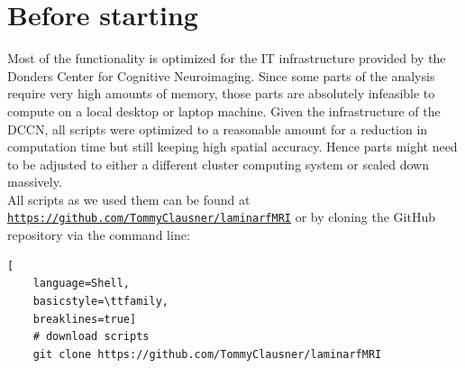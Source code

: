 \documentclass[12pt,a4paper]{scrartcl}
\begin{document}
\section{Before starting}
Most of the functionality is optimized for the IT infrastructure provided by the Donders Center for Cognitive Neuroimaging. Since some parts of the analysis require very high amounts of memory, those parts are absolutely infeasible to compute on a local desktop or laptop machine. Given the infrastructure of the DCCN, all scripts were optimized to a reasonable amount for a reduction in computation time but still keeping high spatial accuracy. Hence parts might need to be adjusted to either a different cluster computing system or scaled down massively.\\
All scripts as we used them can be found at \href{https://github.com/TommyClausner/laminarfMRI}{\nolinkurl{https://github.com/TommyClausner/laminarfMRI}}
or by cloning the GitHub repository via the command line:
\begin{lstlisting}[
    language=Shell,
    basicstyle=\ttfamily,
    breaklines=true]
    # download scripts
    git clone https://github.com/TommyClausner/laminarfMRI
\end{lstlisting}
\end{document}
